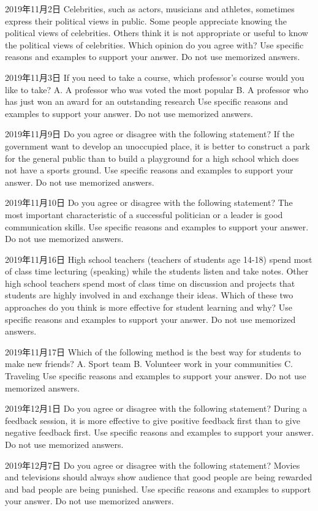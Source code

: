 2019年11月2日
Celebrities, such as actors, musicians and athletes, sometimes express their political views in public. Some people appreciate knowing the political views of celebrities. Others think it is not appropriate or useful to know the political views of celebrities. Which opinion do you agree with?
Use specific reasons and examples to support your answer. Do not use memorized answers.

2019年11月3日
If you need to take a course, which professor's course would you like to take?
A. A professor who was voted the most popular
B. A professor who has just won an award for an outstanding research
Use specific reasons and examples to support your answer. Do not use memorized answers.

2019年11月9日
Do you agree or disagree with the following statement?
If the government want to develop an unoccupied place, it is better to construct a park for the general public than to build a playground for a high school which does not have a sports ground.
Use specific reasons and examples to support your answer. Do not use memorized answers.

2019年11月10日
Do you agree or disagree with the following statement?
The most important characteristic of a successful politician or a leader is good communication skills.
Use specific reasons and examples to support your answer. Do not use memorized answers.

2019年11月16日
High school teachers (teachers of students age 14-18) spend most of class time lecturing (speaking) while the students listen and take notes. Other high school teachers spend most of class time on discussion and projects that students are highly involved in and exchange their ideas. Which of these two approaches do you think is more effective for student learning and why?
Use specific reasons and examples to support your answer. Do not use memorized answers.

2019年11月17日
Which of the following method is the best way for students to make new friends?
A. Sport team
B. Volunteer work in your communities
C. Traveling
Use specific reasons and examples to support your answer. Do not use memorized answers.

2019年12月1日
Do you agree or disagree with the following statement?
During a feedback session, it is more effective to give positive feedback first than to give negative feedback first.
Use specific reasons and examples to support your answer. Do not use memorized answers.

2019年12月7日
Do you agree or disagree with the following statement?
Movies and televisions should always show audience that good people are being rewarded and bad people are being punished.
Use specific reasons and examples to support your answer. Do not use memorized answers.

